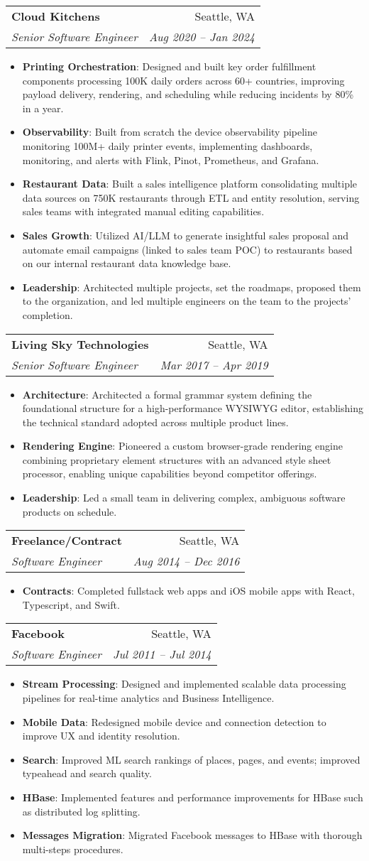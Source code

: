 \documentclass[letterpaper,11pt]{article}
\makeatletter
\newcommand{\resumeItem}[2]{
  \item\small{
    \textbf{#1}{: #2 \vspace{-2pt}}
  }
}
\newcommand{\resumeSubheading}[4]{
  \vspace{-1pt}\item
    \begin{tabular*}{0.97\textwidth}[t]{l@{\extracolsep{\fill}}r}
      \textbf{#1} & #2 \\
      \textit{\small#3} & \textit{\small #4} \\
    \end{tabular*}\vspace{-5pt}
}
\newcommand{\resumeItemListStart}{\begin{itemize}}
\newcommand{\resumeItemListEnd}{\end{itemize}\vspace{-5pt}}
\makeatother
\begin{document}
    \resumeSubheading
      {Cloud Kitchens}{Seattle, WA}
      {Senior Software Engineer}{Aug 2020 -- Jan 2024}
      \resumeItemListStart
        \resumeItem{Printing Orchestration}
          {Designed and built key order fulfillment components processing 100K daily orders across 60+ countries, improving payload delivery, rendering, and scheduling while reducing incidents by 80\% in a year.}
        \resumeItem{Observability}
          {Built from scratch the device observability pipeline monitoring 100M+ daily printer events, implementing dashboards, monitoring, and alerts with Flink, Pinot, Prometheus, and Grafana.}
        \resumeItem{Restaurant Data}
          {Built a sales intelligence platform consolidating multiple data sources on 750K restaurants through ETL and entity resolution, serving sales teams with integrated manual editing capabilities.}
        \resumeItem{Sales Growth}
          {Utilized AI/LLM to generate insightful sales proposal and automate email campaigns (linked to sales team POC) to restaurants based on our internal restaurant data knowledge base.}
        \resumeItem{Leadership}
          {Architected multiple projects, set the roadmaps, proposed them to the organization, and led multiple engineers on the team to the projects' completion.}
      \resumeItemListEnd

    \resumeSubheading
      {Living Sky Technologies}{Seattle, WA}
      {Senior Software Engineer}{Mar 2017 -- Apr 2019}
      \resumeItemListStart
        \resumeItem{Architecture}
          {Architected a formal grammar system defining the foundational structure for a high-performance WYSIWYG editor, establishing the technical standard adopted across multiple product lines.}
        \resumeItem{Rendering Engine}
          {Pioneered a custom browser-grade rendering engine combining proprietary element structures with an advanced style sheet processor, enabling unique capabilities beyond competitor offerings.}
        \resumeItem{Leadership}
          {Led a small team in delivering complex, ambiguous software products on schedule.}
      \resumeItemListEnd

    \resumeSubheading
      {Freelance/Contract}{Seattle, WA}
      {Software Engineer}{Aug 2014 -- Dec 2016}
      \resumeItemListStart
        \resumeItem{Contracts}
          {Completed fullstack web apps and iOS mobile apps with React, Typescript, and Swift.}
      \resumeItemListEnd

    \resumeSubheading
      {Facebook}{Seattle, WA}
      {Software Engineer}{Jul 2011 -- Jul 2014}
      \resumeItemListStart
        \resumeItem{Stream Processing}
          {Designed and implemented scalable data processing pipelines for real-time analytics and Business Intelligence.}
        \resumeItem{Mobile Data}
          {Redesigned mobile device and connection detection to improve UX and identity resolution.}
        \resumeItem{Search}
          {Improved ML search rankings of places, pages, and events; improved typeahead and search quality.}
        \resumeItem{HBase}
          {Implemented features and performance improvements for HBase such as distributed log splitting.}
        \resumeItem{Messages Migration}
          {Migrated Facebook messages to HBase with thorough multi-steps procedures.}
      \resumeItemListEnd
\end{document}
